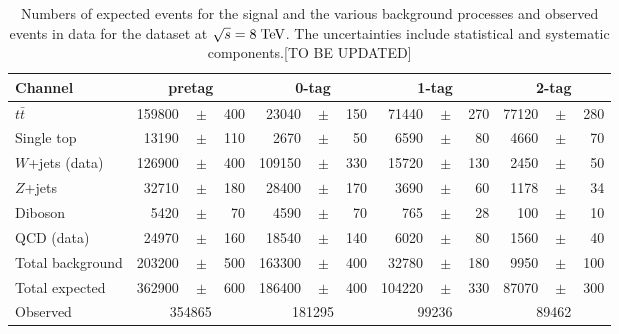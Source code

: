 \begin{table}
  \caption[Event yields for the \ejets{} samples at $\sqrt{s} = 8 \TeV{}$]{
    Numbers of expected events for the \ttbar{} signal and the various background 
    processes and observed events in data for the \ejets{} dataset
    at $\sqrt{s} = 8 \TeV{}$.
    The uncertainties include statistical and systematic components.[TO BE UPDATED]}
  \label{tab:yields2012ele}
  \begin{tabular}{ l  rrr  rrr  rrr  rrr }
    \toprule
    Channel & \multicolumn{3}{c}{\ejets{} pretag} & \multicolumn{3}{c}{\ejets{} 0-tag} & \multicolumn{3}{c}{\ejets{} 1-tag} & \multicolumn{3}{c}{\ejets{} 2-tag} \\
    \midrule
    $t\bar{t}$       & 159800 &$\!\!\!\pm\!\!\!$& 400  & 23040 &$\!\!\!\pm\!\!\!$& 150  & 71440 &$\!\!\!\pm\!\!\!$& 270  & 77120 &$\!\!\!\pm\!\!\!$& 280  \\
    Single top       & 13190  &$\!\!\!\pm\!\!\!$& 110  & 2670  &$\!\!\!\pm\!\!\!$& 50  & 6590  &$\!\!\!\pm\!\!\!$& 80  & 4660  &$\!\!\!\pm\!\!\!$& 70   \\
    $W$+jets (data)  & 126900 &$\!\!\!\pm\!\!\!$& 400 & 109150  &$\!\!\!\pm\!\!\!$& 330  & 15720 &$\!\!\!\pm\!\!\!$& 130  & 2450  &$\!\!\!\pm\!\!\!$& 50  \\
    $Z$+jets         & 32710  &$\!\!\!\pm\!\!\!$& 180  & 28400   &$\!\!\!\pm\!\!\!$& 170   & 3690  &$\!\!\!\pm\!\!\!$& 60  & 1178   &$\!\!\!\pm\!\!\!$& 34   \\
    Diboson          & 5420  &$\!\!\!\pm\!\!\!$& 70   & 4590  &$\!\!\!\pm\!\!\!$& 70 & 765 &$\!\!\!\pm\!\!\!$& 28 & 100  &$\!\!\!\pm\!\!\!$& 10 \\
    QCD (data)       & 24970  &$\!\!\!\pm\!\!\!$& 160  & 18540  &$\!\!\!\pm\!\!\!$& 140  & 6020  &$\!\!\!\pm\!\!\!$& 80  & 1560   &$\!\!\!\pm\!\!\!$& 40  \\
    \midrule
    Total background & 203200 &$\!\!\!\pm\!\!\!$& 500 & 163300  &$\!\!\!\pm\!\!\!$& 400  & 32780 &$\!\!\!\pm\!\!\!$& 180 & 9950  &$\!\!\!\pm\!\!\!$& 100  \\
    \midrule
    Total expected   & 362900 &$\!\!\!\pm\!\!\!$& 600 & 186400 &$\!\!\!\pm\!\!\!$& 400  & 104220 &$\!\!\!\pm\!\!\!$& 330 & 87070 &$\!\!\!\pm\!\!\!$& 300  \\
    \midrule
    Observed         & \multicolumn{3}{c}{354865}     & \multicolumn{3}{c}{181295}     & \multicolumn{3}{c}{99236}     & \multicolumn{3}{c}{89462}     \\
    \bottomrule
  \end{tabular}
\end{table}
